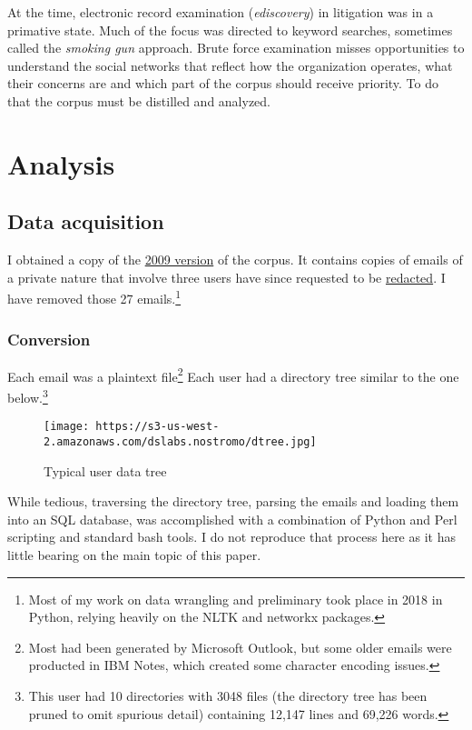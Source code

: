\documentclass[]{article}
\let\rmarkdownfootnote\footnote%
\def\footnote{\protect\rmarkdownfootnote}
\begin{document}
At the time, electronic record examination (\emph{ediscovery}) in
litigation was in a primative state. Much of the focus was directed to
keyword searches, sometimes called the \emph{smoking gun} approach.
Brute force examination misses opportunities to understand the social
networks that reflect how the organization operates, what their concerns
are and which part of the corpus should receive priority. To do that the
corpus must be distilled and analyzed.

\hypertarget{analysis}{%
\section{Analysis}\label{analysis}}

\hypertarget{data-acquisition}{%
\subsection{Data acquisition}\label{data-acquisition}}

I obtained a copy of the \href{https://www.cs.cmu.edu/~./enron/}{2009
version} of the corpus. It contains copies of emails of a private nature
that involve three users have since requested to be
\href{https://www.cs.cmu.edu/~./enron/DELETIONS.txt}{redacted}. I have
removed those 27 emails.\footnote{Most of my work on data wrangling and
  preliminary took place in 2018 in Python, relying heavily on the NLTK
  and networkx packages.}

\hypertarget{conversion}{%
\subsubsection{Conversion}\label{conversion}}

Each email was a plaintext file\footnote{Most had been generated by
  Microsoft Outlook, but some older emails were producted in IBM Notes,
  which created some character encoding issues.} Each user had a
directory tree similar to the one below.\footnote{This user had 10
  directories with 3048 files (the directory tree has been pruned to
  omit spurious detail) containing 12,147 lines and 69,226 words.}

\begin{figure}
\centering
\texttt{[image: https://s3-us-west-2.amazonaws.com/dslabs.nostromo/dtree.jpg]}
\caption{Typical user data tree}
\end{figure}

While tedious, traversing the directory tree, parsing the emails and
loading them into an SQL database, was accomplished with a combination
of Python and Perl scripting and standard bash tools. I do not reproduce
that process here as it has little bearing on the main topic of this
paper.
\end{document}
